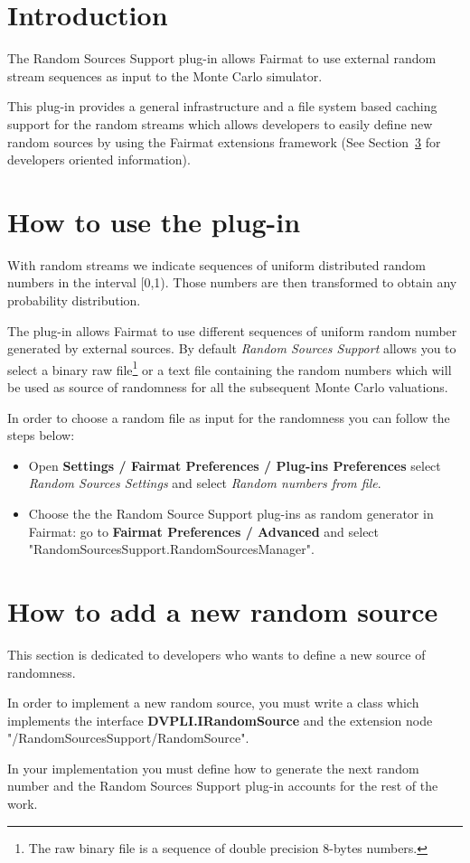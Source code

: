 \newcommand{\pluginName}{Random Sources Support}
\newcommand{\pluginVersion}{1.0}



\section{Introduction}

The Random Sources Support plug-in allows Fairmat to use external random stream sequences as input to the Monte Carlo simulator.

This plug-in provides a general infrastructure and a file system based caching support for the random streams which allows developers to easily define new random sources by using the Fairmat extensions framework (See Section~\ref{sec.dev} for developers oriented information). 

\section{How to use the plug-in}

With random streams we indicate sequences of uniform distributed random numbers in the interval [0,1). Those numbers are then transformed to obtain any probability distribution.

The plug-in allows Fairmat to use different sequences of uniform random number generated by external sources. 
By default \emph{Random Sources Support} allows you to select a binary raw file\footnote{The raw binary file is a sequence of double precision 8-bytes numbers.} or a text file containing the random numbers which will be used as source of randomness for all the subsequent Monte Carlo valuations.

In order to choose a random file as input for the randomness you can follow the steps below:

\begin{itemize}
\item Open \textbf{Settings / Fairmat Preferences / Plug-ins Preferences} select \emph{Random Sources Settings} and select \emph{Random numbers from file}.
\item Choose the  the Random Source Support plug-ins as random generator in Fairmat: go to \textbf{Fairmat Preferences / Advanced} and select "RandomSourcesSupport.RandomSourcesManager".
\end{itemize}

\section{How to add a new random source}
\label{sec.dev}
This section is dedicated to developers who wants to define a new source of randomness.

In order to implement a new random source, you must write a
class which implements the interface \textbf{DVPLI.IRandomSource} and the extension node "/RandomSourcesSupport/RandomSource". 

In your implementation you must define how to generate the next random number and the Random Sources Support plug-in accounts for the rest of the work.


